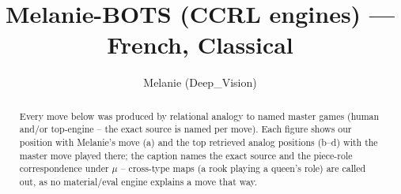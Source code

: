 \documentclass[11pt]{article}
\title{Melanie-BOTS (CCRL engines) — French, Classical}
\author{Melanie (Deep\_Vision)}
\date{}
\begin{document}
\maketitle

\begin{abstract}Every move below was produced by relational analogy to named master games (human and/or top-engine -- the exact source is named per move). Each figure shows our position with Melanie's move (a) and the top retrieved analog positions (b--d) with the master move played there; the caption names the exact source and the piece-role correspondence under $\mu$ -- cross-type maps (a rook playing a queen's role) are called out, as no material/eval engine explains a move that way.\end{abstract}

\begin{figure}[p]\centering
\begin{subfigure}{0.46\textwidth}\centering
\resizebox{\linewidth}{!}{%
\newchessgame
\chessboard[
  setfen={rnb1k2r/pppnqppp/4p3/3pP3/3P4/2N5/PPP1QPPP/R3KBNR b KQkq - 1 7},
  showmover=false,
  pgfstyle=straightmove, color=movearrow, markmove={e8-g8}
]}
\caption{}
\end{subfigure}\hfill
\begin{subfigure}{0.46\textwidth}\centering
\resizebox{\linewidth}{!}{%
\newchessgame
\chessboard[
  setfen={rnbqk2r/pp1nppbp/3p2p1/P7/2PP4/5N2/1P2BPPP/RNBQK2R b KQkq - 2 9},
  showmover=false,
  pgfstyle=straightmove, color=movearrow, markmove={e8-g8}
]}
\caption{}
\end{subfigure}
\\[4pt]
\begin{subfigure}{0.46\textwidth}\centering
\resizebox{\linewidth}{!}{%
\newchessgame
\chessboard[
  setfen={rnbqk2r/pp1nppbp/3p2p1/P7/2PP4/5N2/1P2BPPP/RNBQK2R b KQkq - 2 9},
  showmover=false,
  pgfstyle=straightmove, color=movearrow, markmove={e8-g8}
]}
\caption{}
\end{subfigure}\hfill
\begin{subfigure}{0.46\textwidth}\centering
\resizebox{\linewidth}{!}{%
\newchessgame
\chessboard[
  setfen={rnbqk2r/pp1nppbp/3p2p1/P7/2PP4/5N2/1P2BPPP/RNBQK2R b KQkq - 2 9},
  showmover=false,
  pgfstyle=straightmove, color=movearrow, markmove={e8-g8}
]}
\caption{}
\end{subfigure}

\end{figure}
\end{document}
